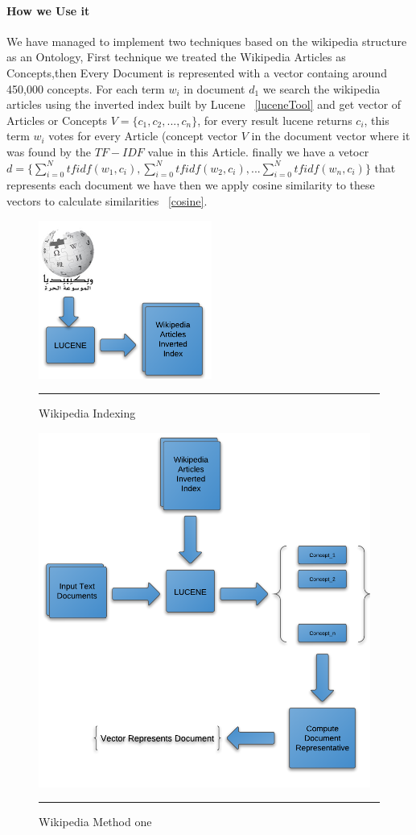 \paragraph{How we Use it}	
We have managed to implement two techniques based on the wikipedia structure as an Ontology, First technique we treated the Wikipedia Articles as Concepts\citep{wiki_1},then Every Document is represented with a vector containg around 450,000 concepts.
For each term $w_i$ in document $d_1$ we search the wikipedia articles using the inverted index built by Lucene ~\ref{luceneTool} and get vector of Articles or Concepts $V = \{c_1,c_2,...,c_n\}$, for every result lucene returns $c_i$, this term $w_i$ votes for every Article (concept  vector $V$ in the document vector where it was found by the $TF-IDF$ value in this Article.
finally we have a vetocr $d =\{\sum_{i=0}^{N} tfidf(w_1,c_i),\sum_{i=0}^{N} tfidf(w_2,c_i),...\sum_{i=0}^{N} tfidf(w_n,c_i)\} $ that represents each document we have then we apply cosine similarity to these vectors to calculate similarities ~\ref{cosine}.\\
\begin{figure}[htbp]
	\centering
		\includegraphics{./Figures/wiki_1.png}
		\rule{35em}{0.05pt}
	\caption[Wikipedia Indexing]{Wikipedia Indexing}
	\label{fig:Indexing}
\end{figure}

\begin{figure}[htbp]
	\centering
		\includegraphics{./Figures/wiki_3.png}
		\rule{35em}{0.05pt}
	\caption[Wikipedia Method one]{Wikipedia Method one}
	\label{fig:Method one}
\end{figure}

